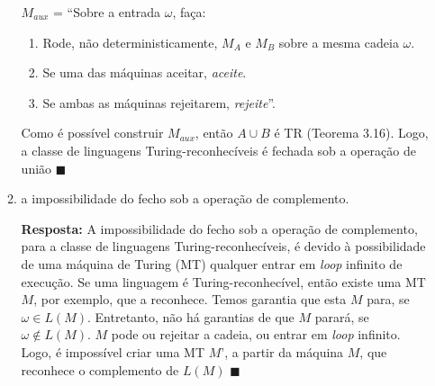 \documentclass[12pt,a4paper,oneside]{article}
\begin{document}
\begin{enumerate}
\begin{enumerate}
{			$M_{aux}$ = ``Sobre a entrada $\omega$, faça:
			\begin{enumerate}
				\item Rode, não deterministicamente, $M_A$ e $M_B$ sobre a mesma cadeia $\omega$. 
				\item Se uma das máquinas aceitar, {\it aceite}. 
				\item Se ambas as máquinas rejeitarem, {\it rejeite}''.
			\end{enumerate} 
			
			Como é possível construir $M_{aux}$, então $A \cup B$ é TR (Teorema 3.16).  Logo, a classe de linguagens Turing-reconhecíveis é fechada sob a operação de união $\blacksquare$
		}
	
		\item a impossibilidade do fecho sob a operação de complemento.
		
		\vspace{0.3cm}
		
		{\color{blue} {\bf Resposta:} A impossibilidade do fecho sob a operação de complemento, para a classe de linguagens Turing-reconhecíveis, é devido à possibilidade de uma máquina de Turing (MT) qualquer entrar em {\it loop} infinito de execução. Se uma linguagem é Turing-reconhecível, então existe uma MT $M$, por exemplo, que a reconhece. Temos garantia que esta $M$ para, se $\omega \in L(M)$. Entretanto, não há garantias de que $M$ parará, se $\omega \not\in L(M)$. $M$ pode ou rejeitar a cadeia, ou entrar em {\it loop} infinito. Logo, é impossível criar uma MT $M$', a partir da máquina $M$, que reconhece o complemento de $L(M)$ $\blacksquare$
		}
	\end{enumerate}
	
	

\end{enumerate}
\end{document}
